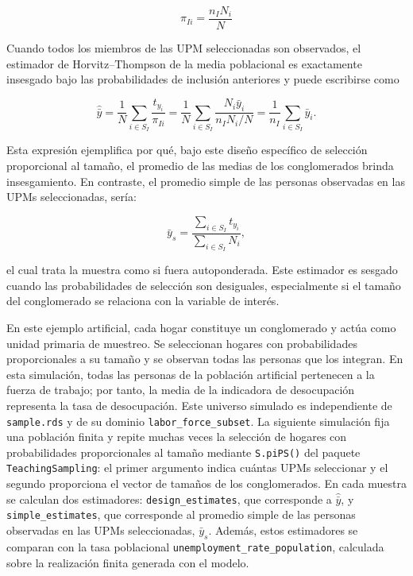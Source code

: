 \documentclass[
  spanish,
  11pt,
  letterpaper,
  oneside,
  open=any]{scrbook}
\begin{document}
\[
\pi_{Ii} = \frac{n_I N_i}{N}
\]

Cuando todos los miembros de las UPM seleccionadas son observados, el
estimador de Horvitz--Thompson de la media poblacional es exactamente
insesgado bajo las probabilidades de inclusión anteriores y puede
escribirse como

\[
\hat{\bar{y}}
= \frac{1}{N}\sum_{i \in S_I}\frac{t_{y_i}}{\pi_{Ii}}
= \frac{1}{N}\sum_{i \in S_I}\frac{N_i\bar{y}_i}{n_I N_i/N}
= \frac{1}{n_I}\sum_{i \in S_I}\bar{y}_i.
\]

Esta expresión ejemplifica por qué, bajo este diseño específico de
selección proporcional al tamaño, el promedio de las medias de los
conglomerados brinda insesgamiento. En contraste, el promedio simple de
las personas observadas en las UPMs seleccionadas, sería:

\[
\bar{y}_s =
\frac{\sum_{i \in S_I}t_{y_i}}
     {\sum_{i \in S_I}N_i},
\]

el cual trata la muestra como si fuera autoponderada. Este estimador es
sesgado cuando las probabilidades de selección son desiguales,
especialmente si el tamaño del conglomerado se relaciona con la variable
de interés.

En este ejemplo artificial, cada hogar constituye un conglomerado y
actúa como unidad primaria de muestreo. Se seleccionan hogares con
probabilidades proporcionales a su tamaño y se observan todas las
personas que los integran. En esta simulación, todas las personas de la
población artificial pertenecen a la fuerza de trabajo; por tanto, la
media de la indicadora de desocupación representa la tasa de
desocupación. Este universo simulado es independiente de
\texttt{sample.rds} y de su dominio \texttt{labor\_force\_subset}. La
siguiente simulación fija una población finita y repite muchas veces la
selección de hogares con probabilidades proporcionales al tamaño
mediante \texttt{S.piPS()} del paquete \texttt{TeachingSampling}: el
primer argumento indica cuántas UPMs seleccionar y el segundo
proporciona el vector de tamaños de los conglomerados. En cada muestra
se calculan dos estimadores: \texttt{design\_estimates}, que corresponde
a \(\hat{\bar{y}}\), y \texttt{simple\_estimates}, que corresponde al
promedio simple de las personas observadas en las UPMs seleccionadas,
\(\bar{y}_s\). Además, estos estimadores se comparan con la tasa
poblacional \texttt{unemployment\_rate\_population}, calculada sobre la
realización finita generada con el modelo.
\end{document}
